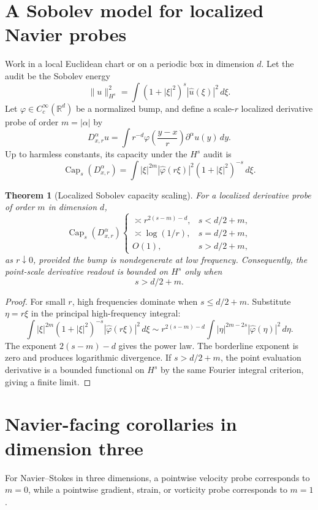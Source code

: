 \documentclass[11pt]{article}
\newtheorem{theorem}{Theorem}
\begin{document}
\section{A Sobolev model for localized Navier probes}

Work in a local Euclidean chart or on a periodic box in dimension $d$.  Let the audit be the Sobolev energy
\[
\|u\|_{H^s}^2=\int (1+|\xi|^2)^s|\widehat u(\xi)|^2\,d\xi.
\]
Let $\varphi\in C_c^\infty(\mathbb R^d)$ be a normalized bump, and define a scale-$r$ localized derivative probe of order $m=|\alpha|$ by
\[
D_{x,r}^{\alpha}u
=
\int r^{-d}\varphi\!\left(\frac{y-x}{r}\right)\partial^\alpha u(y)\,dy.
\]
Up to harmless constants, its capacity under the $H^s$ audit is
\[
\operatorname{Cap}_s(D_{x,r}^{\alpha})
=
\int |\xi|^{2m}|\widehat\varphi(r\xi)|^2(1+|\xi|^2)^{-s}\,d\xi.
\]

\begin{theorem}[Localized Sobolev capacity scaling]
For a localized derivative probe of order $m$ in dimension $d$,
\[
\operatorname{Cap}_s(D_{x,r}^{\alpha})
\begin{cases}
\asymp r^{2(s-m)-d}, & s<d/2+m,\\
\asymp \log(1/r), & s=d/2+m,\\
O(1), & s>d/2+m,
\end{cases}
\]
as $r\downarrow0$, provided the bump is nondegenerate at low frequency.  Consequently, the point-scale derivative readout is bounded on $H^s$ only when
\[
\boxed{s>d/2+m.}
\]
\end{theorem}

\begin{proof}
For small $r$, high frequencies dominate when $s\le d/2+m$.  Substitute $\eta=r\xi$ in the principal high-frequency integral:
\[
\int |\xi|^{2m}(1+|\xi|^2)^{-s}|\widehat\varphi(r\xi)|^2\,d\xi
\sim
r^{2(s-m)-d}\int |\eta|^{2m-2s}|\widehat\varphi(\eta)|^2\,d\eta.
\]
The exponent $2(s-m)-d$ gives the power law.  The borderline exponent is zero and produces logarithmic divergence.  If $s>d/2+m$, the point evaluation derivative is a bounded functional on $H^s$ by the same Fourier integral criterion, giving a finite limit.
\end{proof}

\section{Navier-facing corollaries in dimension three}

For Navier--Stokes in three dimensions, a pointwise velocity probe corresponds to $m=0$, while a pointwise gradient, strain, or vorticity probe corresponds to $m=1$.
\end{document}

